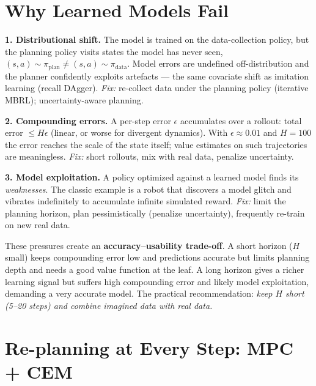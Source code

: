 \documentclass[11pt, oneside]{book}
\begin{document}
\section{Why Learned Models Fail}

\begin{notebox}[title={Three failure modes of learned models}]
\textbf{1. Distributional shift.} The model is trained on the data-collection policy, but
the planning policy visits states the model has never seen,
$(s,a)\sim\pi_{\text{plan}} \neq (s,a)\sim\pi_{\text{data}}$. Model errors are undefined
off-distribution and the planner confidently exploits artefacts --- the same covariate
shift as imitation learning (recall DAgger). \emph{Fix:} re-collect data under the
planning policy (iterative MBRL); uncertainty-aware planning.

\textbf{2. Compounding errors.} A per-step error $\epsilon$ accumulates over a rollout:
total error $\le H\epsilon$ (linear, or worse for divergent dynamics). With
$\epsilon\approx 0.01$ and $H=100$ the error reaches the scale of the state itself; value
estimates on such trajectories are meaningless. \emph{Fix:} short rollouts, mix with real
data, penalize uncertainty.

\textbf{3. Model exploitation.} A policy optimized against a learned model finds its
\emph{weaknesses}. The classic example is a robot that discovers a model glitch and
vibrates indefinitely to accumulate infinite simulated reward. \emph{Fix:} limit the
planning horizon, plan pessimistically (penalize uncertainty), frequently re-train on new
real data.
\end{notebox}

These pressures create an \textbf{accuracy--usability trade-off}. A short horizon ($H$
small) keeps compounding error low and predictions accurate but limits planning depth and
needs a good value function at the leaf. A long horizon gives a richer learning signal but
suffers high compounding error and likely model exploitation, demanding a very accurate
model. The practical recommendation: \emph{keep $H$ short (5--20 steps) and combine
imagined data with real data.}

\section{Re-planning at Every Step: MPC + CEM}
\end{document}
